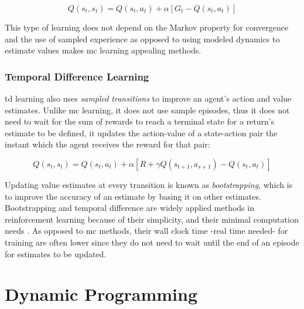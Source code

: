 \documentclass[../report.tex]{subfiles}
\begin{document}
\begin{equation}\label{eq:mc_learning}
    Q(s_t,s_t) = Q(s_t,a_t) + \alpha[G_t - Q(s_t,a_t)]
\end{equation}

This type of learning does not depend on the Markov property for convergence and the use of sampled experience as opposed to using modeled dynamics to estimate values makes \ac{mc} learning appealing methods. 

\subsubsection{Temporal Difference Learning}
\ac{td} learning also uses \textit{sampled transitions} to improve an agent's action and value estimates. Unlike \ac{mc} learning, it does not use sample episodes, thus it does not need to wait for the sum of rewards to reach a terminal state for a return's estimate to be defined, it updates the action-value of a state-action pair the instant which the agent receives the reward for that pair:

\begin{equation}\label{eq:td_learning}
    Q(s_t,s_t) = Q(s_t,a_t) + \alpha[R + \gamma Q(s_{t+1},a_{s+1}) - Q(s_t,a_t)]
\end{equation}

Updating value estimates at every transition is known as \textit{bootstrapping}, which is to improve the accuracy of an estimate by basing it on other estimates. Bootstrapping and temporal difference are widely applied methods in reinforcement learning because of their simplicity, and their minimal computation needs \cite{intro_rl}. As opposed to \ac{mc} methods, their wall clock time -real time needed- for training are often lower since they do not need to wait until the end of an episode for estimates to be updated.

\section{Dynamic Programming}\label{sec:dp}
\end{document}
